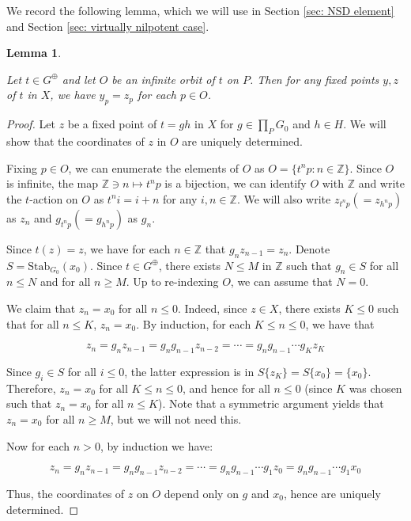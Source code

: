 \documentclass[12pt]{article}
\newtheorem{lem}[thm]{Lemma}
\theoremstyle{definition}
\newcommand{\Z}{\mathbb{Z}}
\begin{document}
We record the following lemma, which we will use in Section \ref{sec: NSD element} and Section \ref{sec: virtually nilpotent case}. 

\begin{lem}
    \label{Inf orb fix pt}

    Let $t \in G^{\oplus}$ and let $O$ be an infinite orbit of $t$ on $P$. Then for any fixed points $y,z$ of $t$ in $X$, we have $y_p = z_p$ for each $p \in O$. 
    
\end{lem}

\begin{proof}
    Let $z$ be a fixed point of $t = gh$ in $X$ for $g \in \prod_P G_0$ and $h \in H$. We will show that the coordinates of $z$ in $O$ are uniquely determined. 

    Fixing $p \in O$, we can enumerate the elements of $O$ as $O = \{t^n p : n \in \Z\}$. Since $O$ is infinite, the map $\Z \ni n \mapsto t^n p$ is a bijection, we can identify $O$ with $\Z$ and write the $t$-action on $O$ as $t^n i = i + n$ for any $i,n \in \Z$. We will also write $z_{t^n p} (= z_{h^n p})$ as $z_n$ and $g_{t^n p} (= g_{h^n p})$ as $g_n$.

    Since $t(z) = z$, we have for each $n \in \Z$ that $g_n z_{n-1} = z_n$. Denote $S = \mathrm{Stab}_{G_0}(x_0)$. Since $t \in G^{\oplus}$, there exists $N \leq M$ in $\Z$ such that $g_n \in S$ for all $n \leq N$ and for all $n \geq M$. Up to re-indexing $O$, we can assume that $N = 0$. 

    We claim that $z_n = x_0$ for all $n \leq 0$. Indeed, since $z \in X$, there exists $K \leq 0$ such that for all $n \leq K$, $z_n = x_0$. By induction, for each $K \leq n \leq 0$, we have that 
    
    $$z_n = g_nz_{n-1} = g_n g_{n-1} z_{n-2} = \cdots = g_n g_{n-1} \cdots g_K z_K$$
    
    Since $g_i \in S$ for all $i \leq 0$, the latter expression is in $S \{z_K\} = S \{x_0\} = \{x_0\}$. Therefore, $z_n = x_0$ for all $K \leq n \leq 0$, and hence for all $n \leq 0$ (since $K$ was chosen such that $z_n = x_0$ for all $n \leq K$). Note that a symmetric argument yields that $z_n = x_0$ for all $n \geq M$, but we will not need this.

    Now for each $n > 0$, by induction we have: 

    $$z_n = g_n z_{n-1} = g_n g_{n-1} z_{n-2} = \cdots = g_n g_{n-1} \cdots g_1 z_0 = g_n g_{n-1} \cdots g_1 x_0$$

    Thus, the coordinates of $z$ on $O$ depend only on $g$ and $x_0$, hence are uniquely determined. 

    
\end{proof}
\end{document}
